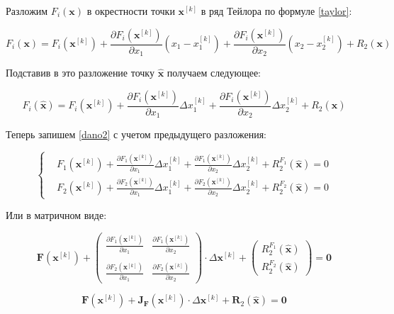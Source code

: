 \documentclass[12pt, a4paper]{article}
\newcommand{\roubr}[1]{\left(#1\right)}
\begin{document}
Разложим $F_i\roubr{\mathbf{x}}$ в окрестности точки $\mathbf{x}^{[k]}$ в ряд Тейлора по формуле \eqref{taylor}:

$$ F_i\roubr{\mathbf{x}} = F_i\roubr{\mathbf{x}^{[k]}} + \frac{\partial F_i\roubr{\mathbf{x}^{[k]}}}{\partial x_1} \roubr{x_1 - x^{[k]}_1} + \frac{\partial F_i\roubr{\mathbf{x}^{[k]}}}{\partial x_2} \roubr{x_2 - x^{[k]}_2} + R_2\roubr{\mathbf{x}} $$

Подставив в это разложение точку $\hat{\mathbf{x}}$ получаем следующее:

$$\displaystyle F_i\roubr{\hat{\mathbf{x}}} = F_i\roubr{\mathbf{x}^{[k]}} + \frac{\partial F_i\roubr{\mathbf{x}^{[k]}}}{\partial x_1} \Delta x^{[k]}_1 + \frac{\partial F_i\roubr{\mathbf{x}^{[k]}}}{\partial x_2} \Delta x^{[k]}_2 + R_2\roubr{\hat{\mathbf{x}}} $$

Теперь запишем \eqref{dano2} с учетом предыдущего разложения:

$$ \left\{
\begin{aligned}
& F_1\roubr{\mathbf{x}^{[k]}} + \frac{\partial F_1\roubr{\mathbf{x}^{[k]}}}{\partial x_1} \Delta x^{[k]}_1 + \frac{\partial F_1\roubr{\mathbf{x}^{[k]}}}{\partial x_2} \Delta x^{[k]}_2 + R^{F_1}_2\roubr{\hat{\mathbf{x}}} = 0 \\
& F_2\roubr{\mathbf{x}^{[k]}} + \frac{\partial F_2\roubr{\mathbf{x}^{[k]}}}{\partial x_1} \Delta x^{[k]}_1 + \frac{\partial F_2\roubr{\mathbf{x}^{[k]}}}{\partial x_2} \Delta x^{[k]}_2 + R^{F_2}_2\roubr{\hat{\mathbf{x}}} = 0
\end{aligned}
\right.$$

Или в матричном виде:

$$
\mathbf{F}\roubr{\mathbf{x}^{[k]}} + 
\begin{pmatrix}
\displaystyle \frac{\partial F_1\roubr{\mathbf{x}^{[k]}}}{\partial x_1} & \displaystyle \frac{\partial F_1\roubr{\mathbf{x}^{[k]}}}{\partial x_2} \\ \\
\displaystyle \frac{\partial F_2\roubr{\mathbf{x}^{[k]}}}{\partial x_1} & \displaystyle \frac{\partial F_2\roubr{\mathbf{x}^{[k]}}}{\partial x_2}
\end{pmatrix} \cdot \Delta \mathbf{x}^{[k]} + \begin{pmatrix}
\displaystyle R^{F_1}_2\roubr{\hat{\mathbf{x}}} \\
\displaystyle R^{F_2}_2\roubr{\hat{\mathbf{x}}}
\end{pmatrix} = \mathbf{0}
$$

$$
\mathbf{F}\roubr{\mathbf{x}^{[k]}} + \mathbf{J}_\mathbf{F}\roubr{\mathbf{x}^{[k]}} \cdot \Delta \mathbf{x}^{[k]} + \mathbf{R}_2\roubr{\hat{\mathbf{x}}} = \mathbf{0}
$$
\end{document}
